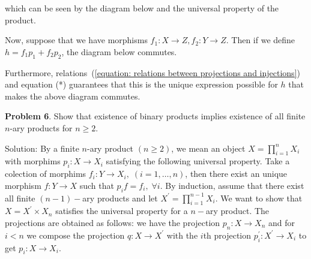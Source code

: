 which can be seen by the diagram below and the universal 
property of the product.
\begin{center}
\end{center}
Now, suppose that we have morphisms $f_1:X\to Z, f_2:Y\to Z$. Then if we define 
$h=f_1p_1+f_2p_2$, the diagram below commutes.
\begin{center}
\end{center}
Furthermore, relations~(\ref{equation: relations between projections and injections}) and equation (*) guarantees that 
this is the unique expression possible for $h$ that makes the above diagram commutes.


\begin{dang}
    \textbf{Problem 6}. Show that existence of binary products implies existence of all finite \(n\)-ary products 
    for \(n\geq 2\).
\end{dang}
Solution: By a finite $n$-ary product $(n\geq2)$, we mean an object $X=\prod_{i=1}^n X_i$ with morphims 
$p_i: X\to X_i$ satisfying the following universal property. 
Take a colection of morphims $f_i:Y\to X_i,\;(i=1,\dots,n)$, then there exist an unique morphism $f: Y\to X$ such that 
$p_if = f_i,\;\forall i$. By induction, assume that there exist all finite $(n-1)-$ary products and let 
$X^\prime =\prod_{i=1}^{n-1}X_i$. We want to show that $X=X^\prime \times X_n$ satisfies the universal property for 
a $n-$ary product. The projections are obtained as follows: we have the projection 
$p_n:X\to X_n$ and for $i<n$ we compose the projection 
$q:X\to X^\prime$ with the $i$th projection $p_i^\prime:X^\prime\to X_i$ to get $p_i:X\to X_i$.\par 

